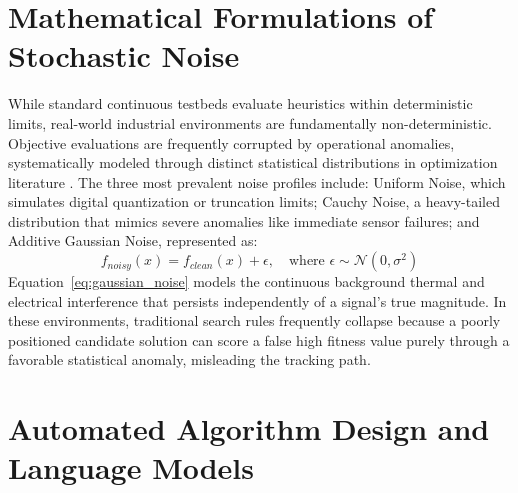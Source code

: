\section{Mathematical Formulations of Stochastic Noise}\label{sec:bg_noise}


While standard continuous testbeds evaluate heuristics within deterministic limits, real-world industrial environments are fundamentally non-deterministic. Objective evaluations are frequently corrupted by operational anomalies, systematically modeled through distinct statistical distributions in optimization literature \cite{Jin2005}. The three most prevalent noise profiles include: Uniform Noise, which simulates digital quantization or truncation limits; Cauchy Noise, a heavy-tailed distribution that mimics severe anomalies like immediate sensor failures; and Additive Gaussian Noise, represented as:
\begin{equation}\label{eq:gaussian_noise}
    f_{noisy}(x) = f_{clean}(x) + \epsilon, \quad \text{where } \epsilon \sim \mathcal{N}(0, \sigma^2)
\end{equation}
Equation~\ref{eq:gaussian_noise} models the continuous background thermal and electrical interference that persists independently of a signal's true magnitude. In these environments, traditional search rules frequently collapse because a poorly positioned candidate solution can score a false high fitness value purely through a favorable statistical anomaly, misleading the tracking path.

\section{Automated Algorithm Design and Language Models}\label{sec:bg_aad_llms}


